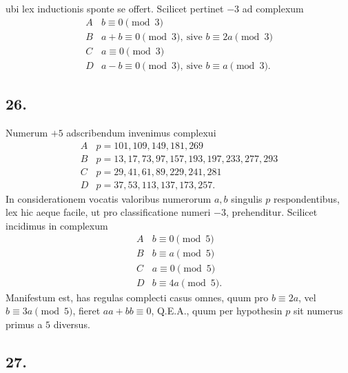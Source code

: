\documentclass[12pt]{article}
\begin{document}
ubi lex inductionis sponte se offert. Scilicet pertinet $-3$ ad complexum
\[
\begin{array}{l|l}
A& b\equiv0\pmod3\\
B& a+b\equiv0\pmod3,\ \text{sive } b\equiv2a\pmod3\\
C& a\equiv0\pmod3\\
D& a-b\equiv0\pmod3,\ \text{sive } b\equiv a\pmod3.
\end{array}
\]

\subsection*{26.}

Numerum $+5$ adscribendum invenimus complexui
\[
\begin{array}{l|l}
A& p=101,109,149,181,269\\
B& p=13,17,73,97,157,193,197,233,277,293\\
C& p=29,41,61,89,229,241,281\\
D& p=37,53,113,137,173,257.
\end{array}
\]
In considerationem vocatis valoribus numerorum $a,b$ singulis $p$ respondentibus, lex hic aeque facile, ut pro classificatione numeri $-3$, prehenditur. Scilicet incidimus in complexum
\[
\begin{array}{l|l}
A& b\equiv0\pmod5\\
B& b\equiv a\pmod5\\
C& a\equiv0\pmod5\\
D& b\equiv4a\pmod5.
\end{array}
\]
Manifestum est, has regulas complecti casus omnes, quum pro $b\equiv2a$, vel $b\equiv3a\pmod5$, fieret $aa+bb\equiv0$, Q.E.A., quum per hypothesin $p$ sit numerus primus a $5$ diversus.

\subsection*{27.}
\end{document}
